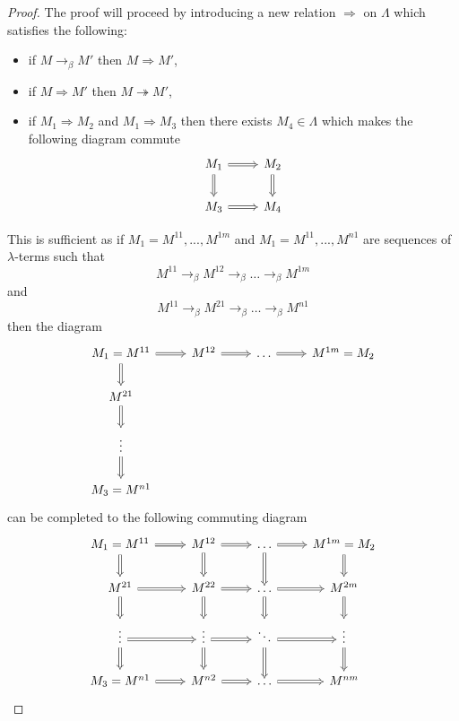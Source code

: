 \documentclass[12pt]{article}
\theoremstyle{plane}
\theoremstyle{definition}
\begin{document}
	\begin{proof}
		The proof will proceed by introducing a new relation $\Rightarrow$ on $\Lambda$ which satisfies the following:
		\begin{itemize}
			\item if $M \to_\beta M'$ then $M \Rightarrow M'$,
			\item if $M \Rightarrow M'$ then $M \twoheadrightarrow M'$,
			\item if $M_1 \Rightarrow M_2$ and $M_1 \Rightarrow M_3$ then there exists $M_4 \in \Lambda$ which makes the following diagram commute
			\[
			\begin{tikzcd}
				M_1\arrow[r,Rightarrow]\arrow[d,Rightarrow] & M_2\arrow[d,Rightarrow]\\
				M_3\arrow[r,Rightarrow] & M_4
			\end{tikzcd}
			\]
		\end{itemize}
		This is sufficient as if $M_1 = M^{11},...,M^{1m}$ and $M_1 = M^{11},...,M^{n1}$ are sequences of $\lambda$-terms such that
		\[M^{11} \to_\beta M^{12} \to_\beta \hdots \to_\beta M^{1m}\]
		and
		\[M^{11} \to_\beta M^{21} \to_\beta \hdots \to_\beta M^{n1}\]
		then the diagram
		\[
		\begin{tikzcd}
			M_1 = M^{11}\arrow[r,Rightarrow]\arrow[d,Rightarrow] & M^{12}\arrow[r,Rightarrow] & \hdots\arrow[r,Rightarrow] & M^{1m} = M_2\\
			M^{21}\arrow[d,Rightarrow]\\
			\vdots\arrow[d,Rightarrow]\\
			M_3 = M^{n1}
		\end{tikzcd}
		\]
		can be completed to the following commuting diagram
		\[
		\begin{tikzcd}
			M_1 = M^{11}\arrow[r,Rightarrow]\arrow[d,Rightarrow] & M^{12}\arrow[r,Rightarrow]\arrow[d,Rightarrow] & \hdots\arrow[r,Rightarrow]\arrow[d,Rightarrow] & M^{1m} = M_2\arrow[d,Rightarrow]\\
			M^{21}\arrow[d,Rightarrow]\arrow[r,Rightarrow] & M^{22}\arrow[r,Rightarrow]\arrow[d,Rightarrow] & \hdots\arrow[r,Rightarrow]\arrow[d,Rightarrow] & M^{2m}\arrow[d,Rightarrow]\\
			\vdots\arrow[d,Rightarrow]\arrow[r,Rightarrow] & \vdots\arrow[d,Rightarrow]\arrow[r,Rightarrow] & \ddots\arrow[d,Rightarrow]\arrow[r,Rightarrow] & \vdots\arrow[d,Rightarrow]\\
			M_3 = M^{n1}\arrow[r,Rightarrow] & M^{n2}\arrow[r,Rightarrow] & \hdots\arrow[r,Rightarrow] & M^{nm}
		\end{tikzcd}
\]
\end{proof}
\end{document}
